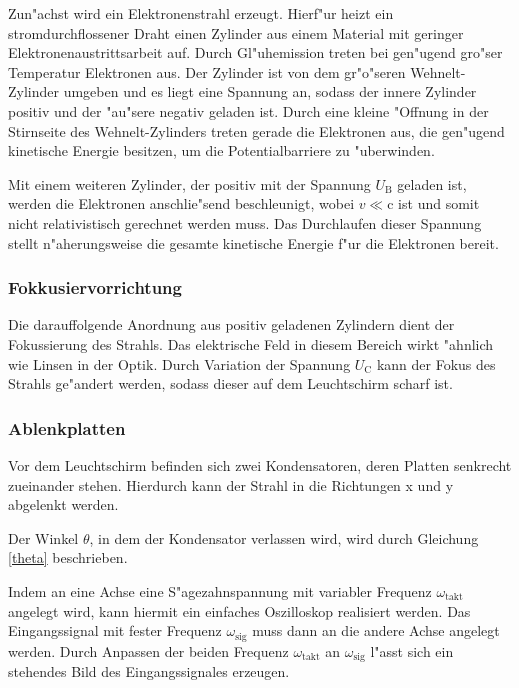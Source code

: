 			Zun"achst wird ein Elektronenstrahl erzeugt. Hierf"ur heizt ein stromdurchflossener Draht einen Zylinder aus einem Material mit geringer Elektronenaustrittsarbeit auf.
			Durch Gl"uhemission treten bei gen"ugend gro"ser Temperatur Elektronen aus.
			Der Zylinder ist von dem gr"o"seren Wehnelt-Zylinder umgeben und es liegt eine Spannung an, sodass der innere Zylinder positiv und der "au"sere negativ geladen ist.
			Durch eine kleine "Offnung in der Stirnseite des Wehnelt-Zylinders treten gerade die Elektronen aus, die gen"ugend kinetische Energie besitzen, um die Potentialbarriere zu "uberwinden.

			Mit einem weiteren Zylinder, der positiv mit der Spannung $U_\mathrm{B}$ geladen ist, werden die Elektronen anschlie"send beschleunigt,
			wobei $v \ll \mathrm{c}$ ist und somit nicht relativistisch gerechnet werden muss.
			Das Durchlaufen dieser Spannung stellt n"aherungsweise die gesamte kinetische Energie f"ur die Elektronen bereit.

		\subsubsection{Fokkusiervorrichtung}

			Die darauffolgende Anordnung aus positiv geladenen Zylindern dient der Fokussierung des Strahls.
			Das elektrische Feld in diesem Bereich wirkt "ahnlich wie Linsen in der Optik.
			Durch Variation der Spannung $U_\mathrm{C}$ kann der Fokus des Strahls ge"andert werden, sodass dieser auf dem Leuchtschirm scharf ist.

		\subsubsection{Ablenkplatten}

			Vor dem Leuchtschirm befinden sich zwei Kondensatoren, deren Platten senkrecht zu\-ein\-ander stehen. Hierdurch kann der Strahl in die Richtungen x und y abgelenkt werden.

			Der Winkel $\theta$, in dem der Kondensator verlassen wird, wird durch Gleichung \ref{theta} be\-schrie\-ben.

			Indem an eine Achse eine S"agezahnspannung mit variabler Frequenz $\omega_\mathrm{takt}$ angelegt wird, kann hiermit ein einfaches Oszilloskop realisiert werden.
			Das Eingangssignal mit fester Frequenz $\omega_\mathrm{sig}$ muss dann an die andere Achse angelegt werden.
			Durch Anpassen der beiden Frequenz $\omega_\mathrm{takt}$ an $\omega_\mathrm{sig}$ l"asst sich ein stehendes Bild des Eingangssignales erzeugen.

